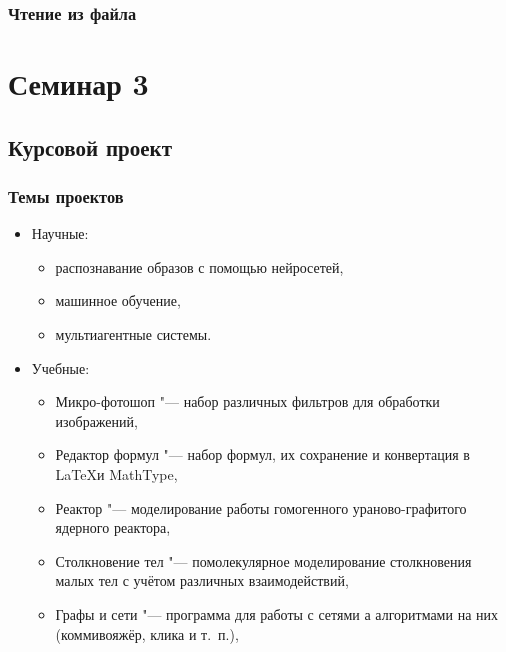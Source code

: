 \documentclass[default]{beamer}
\begin{document}
\begin{frame}
	\frametitle{Чтение из файла}
	
	\lstFileRead
\end{frame}

	\section{Семинар 3}
	\subsection{Курсовой проект}
	
	\begin{frame}
		\frametitle{Темы проектов}
		
		\begin{itemize}
			\item Научные:
			\begin{itemize}
				\item распознавание образов с помощью нейросетей,
				\item машинное обучение,
				\item мультиагентные системы.
			\end{itemize}
			\item Учебные:
			\begin{itemize}
				\item Микро-фотошоп "--- набор различных фильтров для обработки изображений,
				\item Редактор формул "--- набор формул, их сохранение и конвертация в \LaTeX и MathType,
				\item Реактор "--- моделирование работы гомогенного ураново-графитого ядерного реактора,
				\item Столкновение тел "--- помолекулярное моделирование столкновения малых тел с учётом различных взаимодействий,
				\item Графы и сети "--- программа для работы с сетями а алгоритмами на них (коммивояжёр, клика и т.~п.),
			\end{itemize}
		\end{itemize}
	\end{frame}
\end{document}
